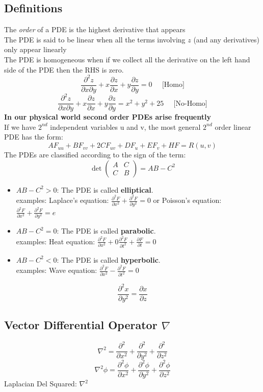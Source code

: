 \documentclass[11pt]{article}
\theoremstyle{definition}
\newcommand{\pd}{{\partial}}
\newcommand*{\pdo}[2]{\frac{\pd{#1}}{\pd{#2}}}%
\newcommand*{\pdt}[2]{\frac{\pd^2{#1}}{\pd{#2}^2}}
\newcommand*{\nbt}{\nabla^2}
\begin{document}
\subsection{Definitions}
The \textit{order} of a PDE is the highest derivative that appears\\
The PDE is said to be linear when all the terms involving $z$ (and any derivatives) only appear linearly\\
The PDE is homogeneous when if we collect all the derivative on the left hand side of the PDE then the RHS is zero.\\
$$\frac{\pd^2z}{\pd x \pd y} + x\frac{\pd z}{\pd x} + y \frac{\pd z}{\pd y} = 0 \;\;\;\;\; \text{[Homo]}$$
$$\frac{\pd^2z}{\pd x \pd y} + x\frac{\pd z}{\pd x} + y \frac{\pd z}{\pd y} = x^2 + y^2 + 25 \;\;\;\;\; \text{[No-Homo]}$$
\textbf{In our physical world second order PDEs arise frequently}\\
If we have $2^{nd}$ independent variables u and v, the most general $2^{nd}$ order linear PDE  has the form:
$$AF_{uu} + BF_{vv} + 2CF_{uv} + DF_u + EF_v + HF = R(u,v)$$
The PDEs are classified according to the sign of the term:
$$\det\begin{pmatrix} A & C \\ C & B \end{pmatrix} = AB - C^2$$
\begin{itemize}
    \item $AB - C^2 > 0$: The PDE is called \textbf{elliptical}. \\
    examples: Laplace's equation: $\frac{\pd^2 F}{\pd x^2} + \frac{\pd^2 F}{\pd y^2} = 0$ or Poisson's equation: $\frac{\pd^2 F}{\pd x^2} + \frac{\pd^2 F}{\pd y^2} = e$
    \item $AB - C^2 = 0$: The PDE is called \textbf{parabolic}. \\
    examples: Heat equation: $\frac{\pd^2 F}{\pd x^2} + 0\frac{\pd^2 F}{\pd t^2} + \frac{\pd F}{\pd t}= 0$ 
    \item $AB - C^2 < 0$: The PDE is called \textbf{hyperbolic}. \\
    examples: Wave equation: $\frac{\pd^2 F}{\pd x^2} - \frac{\pd^2 F}{\pd t^2} = 0$ 
\end{itemize}
$$\pdt{x}{y} = \pdo{x}{z}$$
\subsection{Vector Differential Operator $\nabla$}
$$\nabla^2 = \pdt{}{x} + \pdt{}{y} + \pdt{}{z}$$
$$\nabla^2 \phi = \pdt{\phi}{x} + \pdt{\phi}{y} + \pdt{\phi}{z}$$
Laplacian Del Squared: $\nbt$
\end{document}
